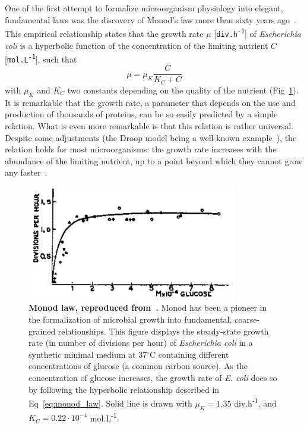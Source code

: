 One of the first attempt to formalize microorganism physiology into elegant, fundamental laws was the discovery of Monod's law more than sixty years ago~\cite{monod_growth_1949}.
This empirical relationship states that the growth rate $\mu$ [\texttt{div.h\textsuperscript{-1}}] of \textit{Escherichia coli} is a hyperbolic function of the concentration of the limiting nutrient $C$ [\texttt{mol.L\textsuperscript{-1}}], such that
\begin{equation}
\label{eq:monod_law}
\mu = \mu_K \frac{C}{K_C + C}
\end{equation}
with $\mu_K$ and $K_C$ two constants depending on the quality of the nutrient (Fig~\ref{fig:monod_law}).
It is remarkable that the growth rate, a parameter that depends on the use and production of thousands of proteins, can be so easily predicted by a simple relation.
What is even more remarkable is that this relation is rather universal.
Despite some adjustments (the Droop model being a well-known example~\cite{droop_thoughts_1973}), the relation holds for most microorganisms: the growth rate increases with the abundance of the limiting nutrient, up to a point beyond which they cannot grow any faster~\cite{koch_why_1988}.

\begin{figure}[tb]
\centering
\includegraphics[height=5cm]{./Fig/Chapter1/monod_law}
\caption{
\textbf{Monod law, reproduced from~\cite{monod_growth_1949}.}
Monod has been a pioneer in the formalization of microbial growth into fundamental, coarse-grained relationships.
This figure displays the steady-state growth rate (in number of divisions per hour) of \textit{Escherichia coli} in a synthetic minimal medium at 37$^{\circ}$C containing different concentrations of glucose (a common carbon source).
As the concentration of glucose increases, the growth rate of \textit{E. coli} does so by following the hyperbolic relationship described in Eq~\ref{eq:monod_law}.
Solid line is drawn with $\mu_K = 1.35$ div.h\textsuperscript{-1}, and $K_C = 0.22 \cdot 10^{-4}$ mol.L\textsuperscript{-1}.
}
\label{fig:monod_law}
\end{figure}

